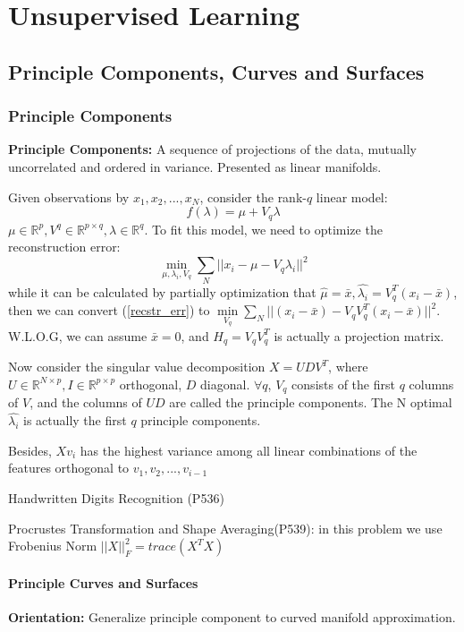 \chapter{Unsupervised Learning}
\section{Principle Components, Curves and Surfaces}
\subsection{Principle Components}
\noindent\textbf{Principle Components: }A sequence of projections of the data, mutually uncorrelated and ordered in variance. Presented as linear manifolds. 

Given observations by $x_1, x_2,...,x_N$, consider the rank-$q$ linear model: 
\begin{equation}
f(\lambda)=\mu+V_q\lambda
\end{equation}
$\mu\in\mathbb{R}^p,V^q\in\mathbb{R}^{p\times q}, \lambda\in\mathbb{R}^q$. To fit this model, we need to optimize the reconstruction error: 
\begin{equation}\label{recstr_err}
\min\limits_{\mu,\lambda_i,V_q}\sum\limits_{N}||x_i-\mu-V_q\lambda_i||^2
\end{equation}
while it can be calculated by partially optimization that 
$\hat{\mu}=\bar{x},\hat{\lambda_i}=V_q^T(x_i-\bar{x})$, 
then we can convert (\ref{recstr_err}) to 
$\min\limits_{V_q}\sum\limits_{N}||(x_i-\bar{x})-V_qV_q^T(x_i-\bar{x})||^2$. 
W.L.O.G, we can assume $\bar{x}=0$, and $H_q=V_qV_q^T$ is actually a projection 
matrix. 

Now consider the singular value decomposition $X=UDV^T$, where $U\in \mathbb{R}^{N\times p}, I\in\mathbb{R}^{p\times p}$ orthogonal, $D$ diagonal. $\forall q$, $V_q$ consists of the first $q$ columns of $V$, and the columns of $UD$ are called the principle components. The N optimal $\hat{\lambda_i}$ is actually the first $q$ principle components. 

Besides, $Xv_i$ has the highest variance among all linear combinations of the features orthogonal to $v_1,v_2,...,v_{i-1}$

\begin{exmp}
	Handwritten Digits Recognition (P536)
\end{exmp}
\begin{exmp}
Procrustes Transformation and Shape Averaging(P539): in this problem we use Frobenius Norm $||X||_F^2=trace(X^TX)$
\end{exmp}

\subsubsection{Principle Curves and Surfaces}
\noindent\textbf{Orientation: }Generalize principle component to curved manifold 
approximation. 